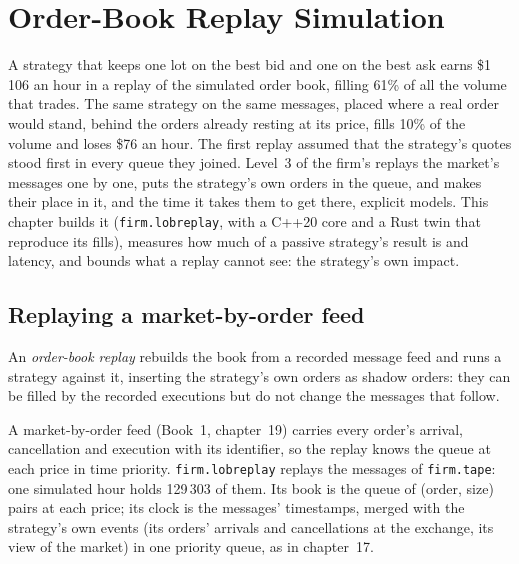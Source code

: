 \chapter{Order-Book Replay Simulation}\label{ch:rs:order-book-replay-simulation}

A strategy that keeps one lot on the best bid and one on the best ask earns \$1\,106 an hour in a replay of the simulated order book, filling
61\% of all the volume that trades. The same strategy on the same messages, placed where a real order would stand, behind the orders already
resting at its price, fills 10\% of the volume and loses \$76 an hour. The first replay assumed that the strategy's quotes stood first in every
queue they joined. Level~3 of the firm's  replays the market's messages one by one, puts the strategy's own orders in the queue, and
makes their place in it, and the time it takes them to get there, explicit models. This chapter builds it (\texttt{firm.lobreplay}, with a C++20
core and a Rust twin that reproduce its fills), measures how much of a passive strategy's result is  and latency, and bounds what a
replay cannot see: the strategy's own impact.

\section{Replaying a market-by-order feed}

\begin{definition}\label{def:rs:order-book-replay-simulation:replay}
An \emph{order-book replay} rebuilds the book from a recorded message feed and runs a strategy against it, inserting the
strategy's own orders as shadow orders: they can be filled by the recorded executions but do not change the messages that follow.
\end{definition}

A market-by-order feed (Book~1, chapter~19) carries every order's arrival, cancellation and execution with its identifier, so the replay knows the
queue at each price in time priority. \texttt{firm.lobreplay} replays the messages of \texttt{firm.tape}: one simulated hour holds 129\,303 of them.
Its book is the queue of (order, size) pairs at each price; its clock is the messages' timestamps, merged with the strategy's own events (its orders'
arrivals and cancellations at the exchange, its view of the market) in one priority queue, as in chapter~17.

